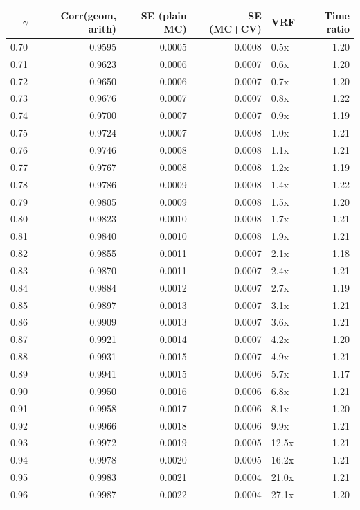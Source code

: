 \begin{tabular}{rrrrlr}
\toprule
$\gamma$ & Corr(geom, arith) & SE (plain MC) & SE (MC+CV) & VRF & Time ratio \\
\midrule
0.70 & 0.9595 & 0.0005 & 0.0008 & 0.5x & 1.20 \\
0.71 & 0.9623 & 0.0006 & 0.0007 & 0.6x & 1.20 \\
0.72 & 0.9650 & 0.0006 & 0.0007 & 0.7x & 1.20 \\
0.73 & 0.9676 & 0.0007 & 0.0007 & 0.8x & 1.22 \\
0.74 & 0.9700 & 0.0007 & 0.0007 & 0.9x & 1.19 \\
0.75 & 0.9724 & 0.0007 & 0.0008 & 1.0x & 1.21 \\
0.76 & 0.9746 & 0.0008 & 0.0008 & 1.1x & 1.21 \\
0.77 & 0.9767 & 0.0008 & 0.0008 & 1.2x & 1.19 \\
0.78 & 0.9786 & 0.0009 & 0.0008 & 1.4x & 1.22 \\
0.79 & 0.9805 & 0.0009 & 0.0008 & 1.5x & 1.20 \\
0.80 & 0.9823 & 0.0010 & 0.0008 & 1.7x & 1.21 \\
0.81 & 0.9840 & 0.0010 & 0.0008 & 1.9x & 1.21 \\
0.82 & 0.9855 & 0.0011 & 0.0007 & 2.1x & 1.18 \\
0.83 & 0.9870 & 0.0011 & 0.0007 & 2.4x & 1.21 \\
0.84 & 0.9884 & 0.0012 & 0.0007 & 2.7x & 1.19 \\
0.85 & 0.9897 & 0.0013 & 0.0007 & 3.1x & 1.21 \\
0.86 & 0.9909 & 0.0013 & 0.0007 & 3.6x & 1.21 \\
0.87 & 0.9921 & 0.0014 & 0.0007 & 4.2x & 1.20 \\
0.88 & 0.9931 & 0.0015 & 0.0007 & 4.9x & 1.21 \\
0.89 & 0.9941 & 0.0015 & 0.0006 & 5.7x & 1.17 \\
0.90 & 0.9950 & 0.0016 & 0.0006 & 6.8x & 1.21 \\
0.91 & 0.9958 & 0.0017 & 0.0006 & 8.1x & 1.20 \\
0.92 & 0.9966 & 0.0018 & 0.0006 & 9.9x & 1.21 \\
0.93 & 0.9972 & 0.0019 & 0.0005 & 12.5x & 1.21 \\
0.94 & 0.9978 & 0.0020 & 0.0005 & 16.2x & 1.21 \\
0.95 & 0.9983 & 0.0021 & 0.0004 & 21.0x & 1.21 \\
0.96 & 0.9987 & 0.0022 & 0.0004 & 27.1x & 1.20 \\

\end{tabular}
